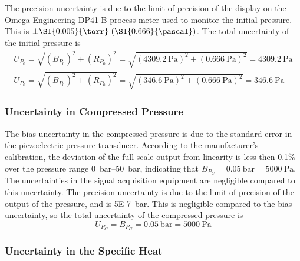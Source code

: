 \documentclass[../main.tex]{subfiles}
\begin{document}
The precision uncertainty is due to the limit of precision of the display
on the Omega Engineering DP41-B process meter used to monitor the initial
pressure. This is $\pm\SI{0.005}{\torr} \ (\SI{0.666}{\pascal})$. The total
uncertainty of the initial pressure is
%
\begin{subequations}
\begin{align}
U_{P_0} = \sqrt{\left(B_{P_0}\right)^2 + \left(R_{P_0}\right)^2} = \sqrt{\left(\SI{4309.2}{\pascal}\right)^2 + \left(\SI{0.666}{\pascal}\right)^2} = \SI{4309.2}{\pascal} \\
U_{P_0} = \sqrt{\left(B_{P_0}\right)^2 + \left(R_{P_0}\right)^2} = \sqrt{\left(\SI{346.6}{\pascal}\right)^2 + \left(\SI{0.666}{\pascal}\right)^2} = \SI{346.6}{\pascal}
\end{align}
\end{subequations}

\subsubsection{Uncertainty in Compressed Pressure}

The bias uncertainty in the compressed pressure is due to the standard
error in the piezoelectric pressure transducer. According to the
manufacturer's calibration, the deviation of the full scale output from
linearity is less then 0.1\% over the pressure range \SIrange{0}{50}{\bar},
indicating that $B_{P_C}=\SI{0.05}{\bar}=\SI{5000}{\pascal}$.
The uncertainties in the signal acquisition equipment are negligible
compared to this uncertainty. The precision uncertainty is due to the limit
of precision of the output of the pressure, and is \SI{5E-7}{\bar}. This
is negligible compared to the bias uncertainty, so the total uncertainty
of the compressed pressure is
%
\begin{equation}
U_{P_C} = B_{P_C} = \SI{0.05}{\bar} = \SI{5000}{\pascal}
\end{equation}

\subsubsection{Uncertainty in the Specific Heat}
\label{sec:unc-cp}
\end{document}
